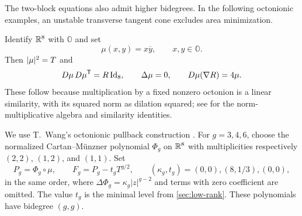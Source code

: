The two-block equations also admit higher bidegrees. In the following
octonionic examples, an unstable transverse tangent cone excludes
area minimization.

Identify $\mathbb R^8$ with $\mathbb O$ and set
\[
 \mu(x,y)=x\overline y,\qquad x,y\in\mathbb O.
\]
Then $\lvert \mu\rvert^2=T$ and
\begin{equation}\label{bh:mu}
 D\mu\,D\mu^{\mathsf T}=R\operatorname{Id}_8,\qquad
 \Delta\mu=0,\qquad D\mu(\nabla R)=4\mu.
\end{equation}
These follow because multiplication by a fixed nonzero octonion is
a linear similarity, with its squared norm as dilation squared;
see \cite[Chapter~1, Lemma~1.3(1) and Appendix, pp.~15--16 and 21--22]{Shapiro2000}
for the norm-multiplicative algebra and similarity identities.

We use T.~Wang's octonionic pullback construction
\cite[Section~3.4]{WangTeng26}. For $g=3,4,6$, choose the normalized
Cartan--M\"unzner polynomial $\Phi_g$ on $\mathbb R^8$ with multiplicities
respectively $(2,2)$, $(1,2)$, and $(1,1)$. Set
\[
 P_g=\Phi_g\circ\mu,\qquad F_g=P_g-t_gT^{g/2},\qquad
 (\kappa_g,t_g)=(0,0),(8,1/3),(0,0),
\]
in the same order, where $\Delta\Phi_g=\kappa_g|z|^{g-2}$ and
terms with zero coefficient are omitted. The value $t_g$ is the
minimal level from \cref{sec:low-rank}. These polynomials have
bidegree $(g,g)$.

